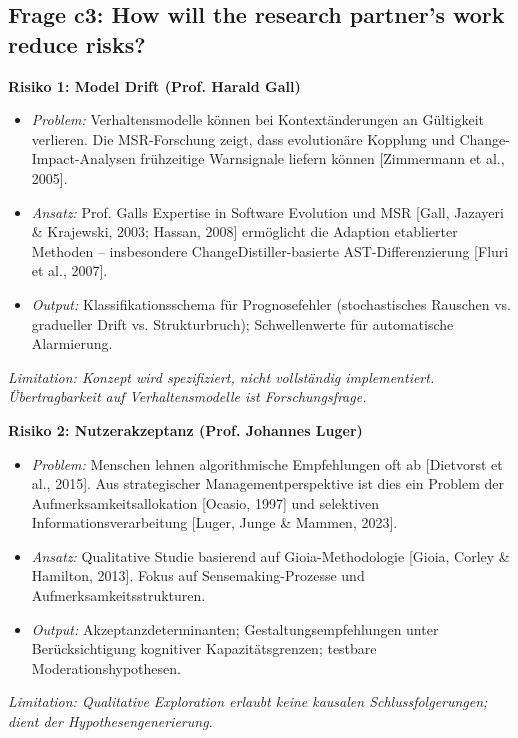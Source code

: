 \documentclass[11pt,a4paper]{article}
\newcommand{\limitation}[1]{\textcolor{limitation}{\textit{Limitation: #1}}}
\newcommand{\evidence}[1]{\textcolor{fehrgray}{[#1]}}
\begin{document}
\subsection{Frage c3: How will the research partner's work reduce risks?}

\textbf{Risiko 1: Model Drift (Prof. Harald Gall)}

\begin{itemize}[leftmargin=2em]
    \item \textit{Problem:} Verhaltensmodelle können bei Kontextänderungen an Gültigkeit verlieren. Die MSR-Forschung zeigt, dass evolutionäre Kopplung und Change-Impact-Analysen frühzeitige Warnsignale liefern können \evidence{Zimmermann et al., 2005}.
    \item \textit{Ansatz:} Prof. Galls Expertise in Software Evolution und MSR \evidence{Gall, Jazayeri \& Krajewski, 2003; Hassan, 2008} ermöglicht die Adaption etablierter Methoden -- insbesondere ChangeDistiller-basierte AST-Differenzierung \evidence{Fluri et al., 2007}.
    \item \textit{Output:} Klassifikationsschema für Prognosefehler (stochastisches Rauschen vs. gradueller Drift vs. Strukturbruch); Schwellenwerte für automatische Alarmierung.
\end{itemize}

\limitation{Konzept wird spezifiziert, nicht vollständig implementiert. Übertragbarkeit auf Verhaltensmodelle ist Forschungsfrage.}

\textbf{Risiko 2: Nutzerakzeptanz (Prof. Johannes Luger)}

\begin{itemize}[leftmargin=2em]
    \item \textit{Problem:} Menschen lehnen algorithmische Empfehlungen oft ab \evidence{Dietvorst et al., 2015}. Aus strategischer Managementperspektive ist dies ein Problem der Aufmerksamkeitsallokation \evidence{Ocasio, 1997} und selektiven Informationsverarbeitung \evidence{Luger, Junge \& Mammen, 2023}.
    \item \textit{Ansatz:} Qualitative Studie basierend auf Gioia-Methodologie \evidence{Gioia, Corley \& Hamilton, 2013}. Fokus auf Sensemaking-Prozesse und Aufmerksamkeitsstrukturen.
    \item \textit{Output:} Akzeptanzdeterminanten; Gestaltungsempfehlungen unter Berücksichtigung kognitiver Kapazitätsgrenzen; testbare Moderationshypothesen.
\end{itemize}

\limitation{Qualitative Exploration erlaubt keine kausalen Schlussfolgerungen; dient der Hypothesengenerierung.}
\end{document}
